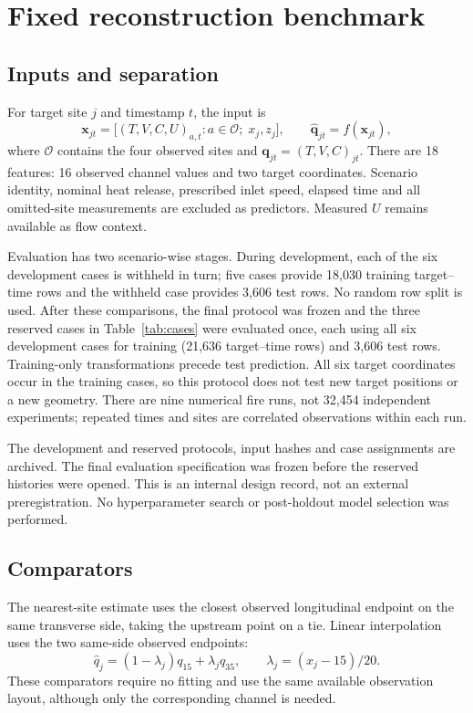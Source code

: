 \documentclass[preprint,12pt,authoryear]{elsarticle}
\begin{document}
\section{Fixed reconstruction benchmark}
\subsection{Inputs and separation}
For target site $j$ and timestamp $t$, the input is
\begin{equation}
\mathbf{x}_{jt}=\big[(T,V,C,U)_{a,t}:a\in\mathcal{O};\;x_j,z_j\big],
\qquad \widehat{\mathbf{q}}_{jt}=f(\mathbf{x}_{jt}),
\end{equation}
where $\mathcal{O}$ contains the four observed sites and
$\mathbf{q}_{jt}=(T,V,C)_{jt}$. There are 18 features: 16 observed channel
values and two target coordinates. Scenario identity, nominal heat release,
prescribed inlet speed, elapsed time and all omitted-site measurements are
excluded as predictors. Measured $U$ remains available as flow context.

Evaluation has two scenario-wise stages. During development, each of the
six development cases is withheld in turn; five cases provide 18,030
training target--time rows and the withheld case provides 3,606 test rows.
No random row split is used. After these comparisons, the final protocol
was frozen and the three reserved cases in Table~\ref{tab:cases} were
evaluated once, each using all six development cases for training
(21,636 target--time rows) and 3,606 test rows. Training-only transformations
precede test prediction. All six target coordinates occur in the training
cases, so this protocol does not test new target positions or a new geometry.
There are nine numerical fire runs, not 32,454 independent experiments;
repeated times and sites are correlated observations within each run.

The development and reserved protocols, input hashes and case assignments
are archived. The final evaluation specification was frozen before the
reserved histories were opened. This is an internal design record, not an
external preregistration. No hyperparameter search or post-holdout model
selection was performed.

\subsection{Comparators}
The nearest-site estimate uses the closest observed longitudinal endpoint
on the same transverse side, taking the upstream point on a tie. Linear
interpolation uses the two same-side observed endpoints:
\begin{equation}
\widehat q_j=(1-\lambda_j)q_{15}+\lambda_j q_{35},
\qquad \lambda_j=(x_j-15)/20.
\end{equation}
These comparators require no fitting and use the same available observation
layout, although only the corresponding channel is needed.
\end{document}
